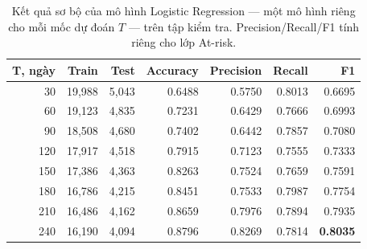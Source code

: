 \begin{table}[H]
  \centering
  \caption{Kết quả sơ bộ của mô hình Logistic Regression --- một mô hình riêng cho mỗi mốc dự đoán $T$ --- trên tập kiểm tra. Precision/Recall/F1 tính riêng cho lớp At-risk.}
  \label{tab:snapshot_results}
  \small
  \begin{tabular}{rrrrrrr}
    \toprule
    \textbf{T, ngày} & \textbf{Train} & \textbf{Test} & \textbf{Accuracy} & \textbf{Precision} & \textbf{Recall} & \textbf{F1} \\
    \midrule
    30 & 19{,}988 & 5{,}043 & 0.6488 & 0.5750 & 0.8013 & 0.6695 \\
    60 & 19{,}123 & 4{,}835 & 0.7231 & 0.6429 & 0.7666 & 0.6993 \\
    90 & 18{,}508 & 4{,}680 & 0.7402 & 0.6442 & 0.7857 & 0.7080 \\
    120 & 17{,}917 & 4{,}518 & 0.7915 & 0.7123 & 0.7555 & 0.7333 \\
    150 & 17{,}386 & 4{,}363 & 0.8263 & 0.7524 & 0.7659 & 0.7591 \\
    180 & 16{,}786 & 4{,}215 & 0.8451 & 0.7533 & 0.7987 & 0.7754 \\
    210 & 16{,}486 & 4{,}162 & 0.8659 & 0.7976 & 0.7894 & 0.7935 \\
    240 & 16{,}190 & 4{,}094 & 0.8796 & 0.8269 & 0.7814 & \textbf{0.8035} \\
    \bottomrule
  \end{tabular}
\end{table}
